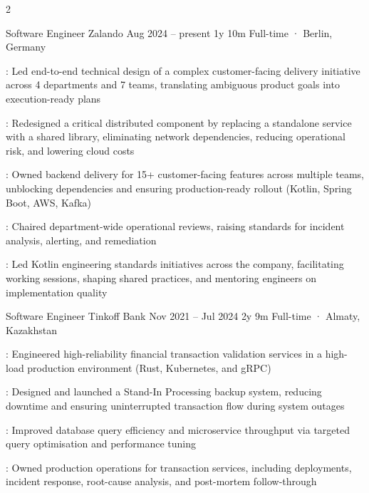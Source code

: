 \documentclass[11pt, a4paper]{style}
\begin{document}
\setcolumnwidth{5.6cm,2.6cm}
\begin{paracol}{2}


    \cvEntry
        {Software Engineer} {Zalando}
        {Aug 2024 -- present} {1y 10m}
        {Full-time · Berlin, Germany}
        {
            \begin{cvItems}
                \item {}: Led end-to-end technical design of a complex customer-facing delivery initiative across 4 departments and 7 teams, translating ambiguous product goals into execution-ready plans
                \item {}: Redesigned a critical distributed component by replacing a standalone service with a shared library, eliminating network dependencies, reducing operational risk, and lowering cloud costs
                \item {}: Owned backend delivery for 15+ customer-facing features across multiple teams, unblocking dependencies and ensuring production-ready rollout (Kotlin, Spring Boot, AWS, Kafka)
                \item {}: Chaired department-wide operational reviews, raising standards for incident analysis, alerting, and remediation
                \item {}: Led Kotlin engineering standards initiatives across the company, facilitating working sessions, shaping shared practices, and mentoring engineers on implementation quality
            \end{cvItems}
        }

    \cvEntry
        {Software Engineer} {Tinkoff Bank}
        {Nov 2021 -- Jul 2024} {2y 9m}
        {Full-time · Almaty, Kazakhstan}
        {
            \begin{cvItems}
                \item {}: Engineered high-reliability financial transaction validation services in a high-load production environment (Rust, Kubernetes, and gRPC)
                \item {}: Designed and launched a Stand-In Processing backup system, reducing downtime and ensuring uninterrupted transaction flow during system outages
                \item {}: Improved database query efficiency and microservice throughput via targeted query optimisation and performance tuning
                \item {}: Owned production operations for transaction services, including deployments, incident response, root-cause analysis, and post-mortem follow-through
            \end{cvItems}
        }


\end{paracol}
\end{document}
